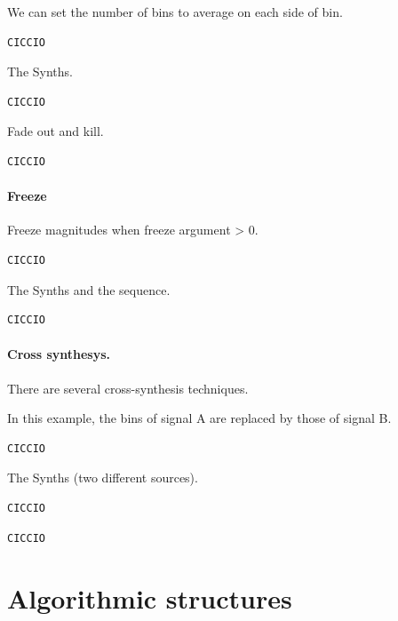 We can set the number of bins to average on each side of bin.

\begin{lstlisting}[frame=single] 
CICCIO
\end{lstlisting}

The Synths.

\begin{lstlisting}[frame=single] 
CICCIO
\end{lstlisting}

Fade out and kill.

\begin{lstlisting}[frame=single] 
CICCIO
\end{lstlisting}

\paragraph{Freeze}\label{freeze}

Freeze magnitudes when freeze argument \textgreater{} 0.

\begin{lstlisting}[frame=single] 
CICCIO
\end{lstlisting}

The Synths and the sequence.

\begin{lstlisting}[frame=single] 
CICCIO
\end{lstlisting}

\paragraph{Cross synthesys.}\label{cross-synthesys.}

There are several cross-synthesis techniques.

In this example, the bins of signal A are replaced by those of signal B.

\begin{lstlisting}[frame=single] 
CICCIO
\end{lstlisting}

The Synths (two different sources).

\begin{lstlisting}[frame=single] 
CICCIO
\end{lstlisting}

\begin{lstlisting}[frame=single] 
CICCIO
\end{lstlisting}

\section{Algorithmic structures}\label{algorithmic-structures}

